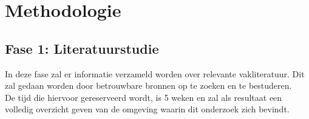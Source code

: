 
\chapter{Methodologie}%
\label{ch:methodologie}


\section{Fase 1: Literatuurstudie}
\label{sec:m-literatuurstudie}
In deze fase zal er informatie verzameld worden over relevante vakliteratuur. Dit zal gedaan worden door betrouwbare bronnen op te zoeken en te bestuderen. \\
De tijd die hiervoor gereserveerd wordt, is 5 weken en zal als resultaat een volledig overzicht geven van de omgeving waarin dit onderzoek zich bevindt. 



